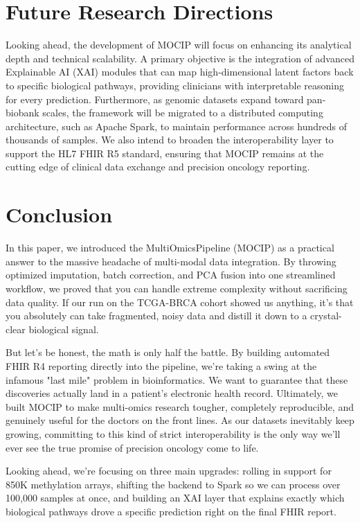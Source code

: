 \documentclass[runningheads]{llncs}
\begin{document}

\section{Future Research Directions}
Looking ahead, the development of MOCIP will focus on enhancing its analytical depth and technical scalability. A primary objective is the integration of advanced Explainable AI (XAI) modules that can map high-dimensional latent factors back to specific biological pathways, providing clinicians with interpretable reasoning for every prediction. Furthermore, as genomic datasets expand toward pan-biobank scales, the framework will be migrated to a distributed computing architecture, such as Apache Spark, to maintain performance across hundreds of thousands of samples. We also intend to broaden the interoperability layer to support the HL7 FHIR R5 standard, ensuring that MOCIP remains at the cutting edge of clinical data exchange and precision oncology reporting.
\section{Conclusion}

In this paper, we introduced the MultiOmicsPipeline (MOCIP) as a practical answer to the massive headache of multi-modal data integration. By throwing optimized imputation, batch correction, and PCA fusion into one streamlined workflow, we proved that you can handle extreme complexity without sacrificing data quality. If our run on the TCGA-BRCA cohort showed us anything, it's that you absolutely can take fragmented, noisy data and distill it down to a crystal-clear biological signal.

But let's be honest, the math is only half the battle. By building automated FHIR R4 reporting directly into the pipeline, we're taking a swing at the infamous "last mile" problem in bioinformatics. We want to guarantee that these discoveries actually land in a patient's electronic health record. Ultimately, we built MOCIP to make multi-omics research tougher, completely reproducible, and genuinely useful for the doctors on the front lines. As our datasets inevitably keep growing, committing to this kind of strict interoperability is the only way we'll ever see the true promise of precision oncology come to life.

Looking ahead, we're focusing on three main upgrades: rolling in support for 850K methylation arrays, shifting the backend to Spark so we can process over 100,000 samples at once, and building an XAI layer that explains exactly which biological pathways drove a specific prediction right on the final FHIR report.
\end{document}
